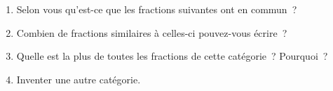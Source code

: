\documentclass[activite]{thedocument}
\begin{document}
\begin{enumerate}
    \item Selon vous qu'est-ce que les fractions suivantes ont en commun~?\vskip20pt
    \begin{center}
    \end{center}\dotedline\dotedline\dotedline
    \item Combien de fractions similaires à celles-ci pouvez-vous écrire~?
    \dotedline\dotedline
    \item Quelle est la plus  de toutes les fractions
    de cette catégorie~? Pourquoi~?
    \dotedline\dotedline\dotedline
    \item Inventer une autre catégorie.
    \dotedline\dotedline\dotedline
\end{enumerate}
\end{document}
